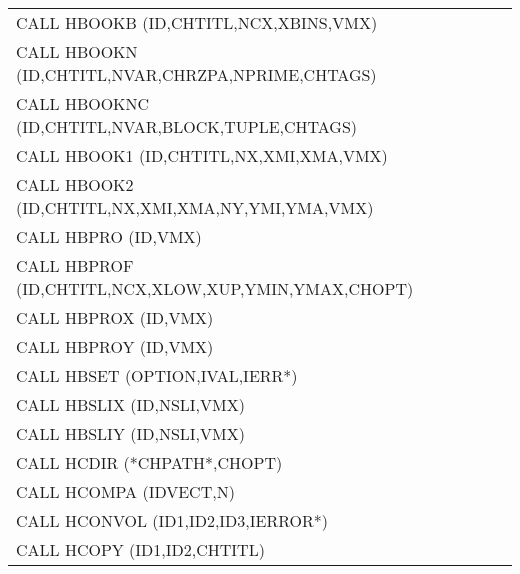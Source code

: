 \begin{longtable}{|>{\ttfamily\small}p{.9\linewidth}r|}
CALL     HBOOKB (ID,CHTITL,NCX,XBINS,VMX)    
&                                                       \pageref{HBOOKB} \\
CALL     HBOOKN (ID,CHTITL,NVAR,CHRZPA,NPRIME,CHTAGS)
&                                                       \pageref{HBOOKN} \\
CALL     HBOOKNC (ID,CHTITL,NVAR,BLOCK,TUPLE,CHTAGS)
&                                                       \pageref{HBOOKNC}\\
CALL     HBOOK1 (ID,CHTITL,NX,XMI,XMA,VMX)   
&                                                       \pageref{HBOOK1} \\
CALL     HBOOK2 (ID,CHTITL,NX,XMI,XMA,NY,YMI,YMA,VMX)
&                                                       \pageref{HBOOK2} \\
CALL     HBPRO  (ID,VMX)                     
&                                                       \pageref{HBPRO}  \\
CALL     HBPROF (ID,CHTITL,NCX,XLOW,XUP,YMIN,YMAX,CHOPT)
&                                                       \pageref{HBPROF} \\
CALL     HBPROX (ID,VMX)                     
&                                                       \pageref{HBPROX} \\
CALL     HBPROY (ID,VMX)                     
&                                                       \pageref{HBPROY} \\
CALL     HBSET  (OPTION,IVAL,IERR*)                
&                                                       \pageref{HBSET}  \\
CALL     HBSLIX (ID,NSLI,VMX)                
&                                                       \pageref{HBSLIX} \\
CALL     HBSLIY (ID,NSLI,VMX)                
&                                                       \pageref{HBSLIY} \\
CALL     HCDIR  (*CHPATH*,CHOPT)             
&                                                       \pageref{HCDIR}  \\
CALL     HCOMPA (IDVECT,N)                   
&                                                       \pageref{HCOMPA} \\
CALL     HCONVOL (ID1,ID2,ID3,IERROR*)
&                                                       \pageref{HCONVOL}\\
CALL     HCOPY  (ID1,ID2,CHTITL)             
&                                                       \pageref{HCOPY}  \\

\end{longtable}
